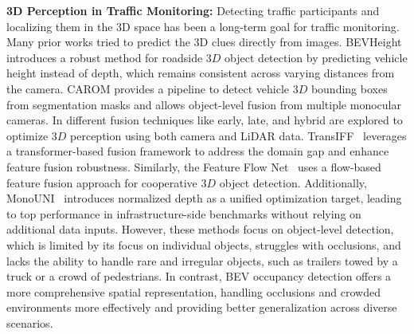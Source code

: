 \textbf{3D Perception in Traffic Monitoring:} Detecting traffic participants and localizing them in the 3D space has been a long-term goal for traffic monitoring. Many prior works tried to predict the 3D clues directly from images. BEVHeight~\cite{yang2023bevheight} introduces a robust method for roadside $3D$ object detection by predicting vehicle height instead of depth, which remains consistent across varying distances from the camera. CAROM \cite{lu2023carom} provides a pipeline to detect vehicle $3D$ bounding boxes from segmentation masks and allows object-level fusion from multiple monocular cameras. In \cite{arnold2020cooperative} different fusion techniques like early, late, and hybrid are explored to optimize $3D$ perception using both camera and LiDAR data. TransIFF~\cite{chen2023transiff} leverages a transformer-based fusion framework to address the domain gap and enhance feature fusion robustness. Similarly, the Feature Flow Net~\cite{yu2024flow} uses a flow-based feature fusion approach for cooperative $3D$ object detection. Additionally, MonoUNI~\cite{jinrang2024monouni} introduces normalized depth as a unified optimization target, leading to top performance in infrastructure-side benchmarks without relying on additional data inputs. However, these methods focus on object-level detection, which is limited by its focus on individual objects, struggles with occlusions, and lacks the ability to handle rare and irregular objects, such as trailers towed by a truck or a crowd of pedestrians. In contrast, BEV occupancy detection offers a more comprehensive spatial representation, handling occlusions and crowded environments more effectively and providing better generalization across diverse scenarios.



